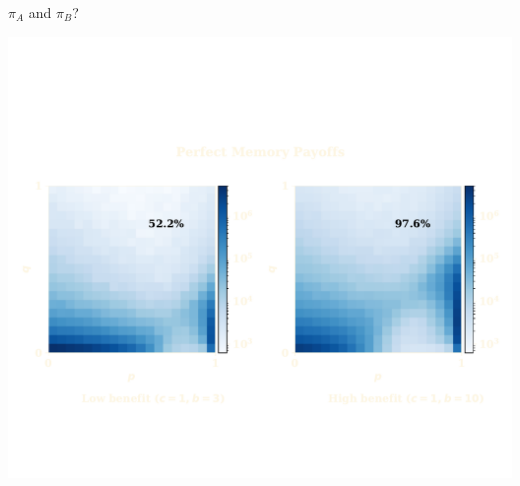\documentclass{beamer}
\begin{document}
\begin{frame}
    \centering
    
\end{frame}

\begin{frame}
    \centering
    \Large{$\pi_A$ and $\pi_B$?}
\end{frame}

\begin{frame}
    \centering
    
\end{frame}

\begin{frame}
    \centering
    
\end{frame}

%     

\begin{frame}
    \centering
    \includegraphics[width=\textwidth]{static/results_one.pdf}
\end{frame}

\begin{frame}
    \centering
    
\end{frame}
\end{document}
